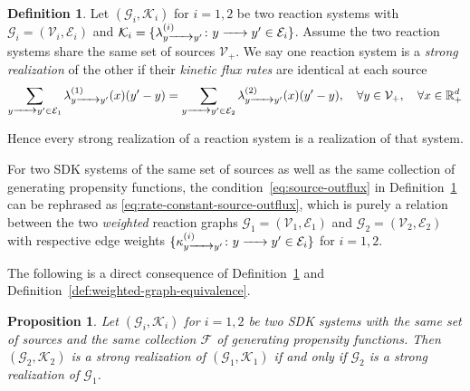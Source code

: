 \documentclass[10pt]{amsart}
\numberwithin{equation}{section}
\theoremstyle{plain}
\newtheorem{proposition}[theorem]{Proposition}
\theoremstyle{definition}
\newtheorem{definition}[theorem]{Definition}
\theoremstyle{remark}
\newcommand{\cE}{\mathcal{E}}
\newcommand{\cF}{\mathcal{F}}
\newcommand{\cG}{\mathcal{G}}
\newcommand{\cK}{\mathcal{K}}
\newcommand{\cV}{\mathcal{V}}
\begin{document}
\begin{definition}\label{def:strong-realization}
Let $(\cG_i,\cK_i)$ for $i=1,2$ be two reaction systems with $\cG_i=(\cV_i,\cE_i)$ and $\cK_i=\{\lambda^{(i)}_{y\ce{->[]} y'}\colon y\ce{->[]} y'\in\cE_i\}$. Assume the two reaction systems share the same set of sources $\cV_+$. We say one reaction system is a \emph{strong realization} of the other if their \emph{kinetic flux rates} are identical at each source\begin{equation}\label{eq:source-outflux}
\sum_{y\ce{->[]} y'\in\cE_1}\lambda^{(1)}_{y\ce{->[]} y'}(x)(y'-y) = \sum_{y\ce{->[]} y'\in\cE_2}\lambda^{(2)}_{y\ce{->[]} y'}(x)(y'-y),\quad \forall y\in\cV_{+},\quad \forall x\in\mathbb{R}^d_+
\end{equation}
\end{definition}

Hence every strong realization of a reaction system is a realization of that system.

For two SDK systems of the same set of sources as well as the same collection of generating propensity functions, the condition~\eqref{eq:source-outflux} in Definition~\ref{def:strong-realization} can be rephrased  as \eqref{eq:rate-constant-source-outflux}, 
which is purely a relation between the two \emph{weighted} reaction graphs $\cG_1=(\cV_1,\cE_1)$ and $\cG_2=(\cV_2,\cE_2)$ with respective edge weights $\{\kappa_{y\ce{->}y'}^{(i)}\colon y\ce{->}y'\in\cE_i\}$ for $i=1,2$.


The following is a direct consequence of Definition~\ref{def:strong-realization} and Definition~\ref{def:weighted-graph-equivalence}.
\begin{proposition}
Let  $(\cG_i,\cK_i)$ for $i=1,2$ be two SDK systems with  the same set of sources and the same collection $\cF$ of  generating propensity functions. Then $(\cG_2,\cK_2)$ is a strong realization of $(\cG_1,\cK_1)$ if and only if $\cG_2$ is a strong realization of $\cG_1$.
\end{proposition}
\end{document}
